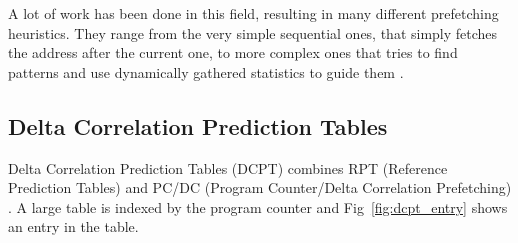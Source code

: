 A lot of work has been done in this field, resulting in many different prefetching heuristics. They
range from the very simple sequential ones, that simply fetches the address after the current one,
to more complex ones that tries to find patterns and use dynamically gathered statistics to guide
them \cite{prefetch_range}.

\subsection{Delta Correlation Prediction Tables} 
Delta Correlation Prediction Tables (DCPT) combines RPT (Reference Prediction Tables) and PC/DC
(Program Counter/Delta Correlation Prefetching) \cite{dcpt}. A large table is indexed by the program
counter and Fig~\ref{fig:dcpt_entry} shows an entry in the table.

\subsection{}



